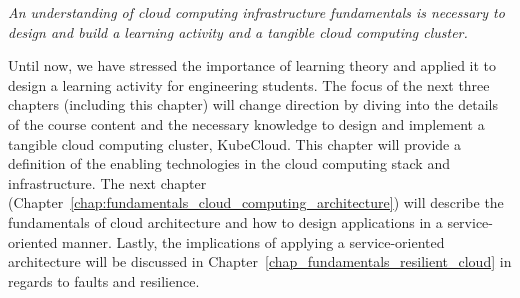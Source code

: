 \begin{theorem}
    \textit{An understanding of cloud computing infrastructure fundamentals is necessary to design and build a learning activity and a tangible cloud computing cluster.}
\end{theorem}

\noindent
Until now, we have stressed the importance of learning theory and applied it to design a learning activity for engineering students. The focus of the next three chapters (including this chapter) will change direction by diving into the details of the course content and the necessary knowledge to design and implement a tangible cloud computing cluster, KubeCloud. This chapter will provide a definition of the enabling technologies in the cloud computing stack and infrastructure. The next chapter (Chapter~\ref{chap:fundamentals_cloud_computing_architecture}) will describe the fundamentals of cloud architecture and how to design applications in a service-oriented manner. Lastly, the implications of applying a service-oriented architecture will be discussed in Chapter~\ref{chap_fundamentals_resilient_cloud} in regards to faults and resilience.